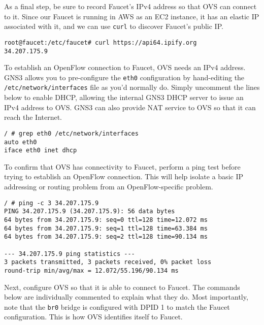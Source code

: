 As a final step, be sure to record Faucet's IPv4 address so that OVS can
connect to it. Since our Faucet is running in AWS as an EC2 instance,
it has an elastic IP associated with it, and we can use \verb|curl| to
discover Faucet's public IP\@.

\begin{verbatim}
root@faucet:/etc/faucet# curl https://api64.ipify.org
34.207.175.9
\end{verbatim}

To establish an OpenFlow connection to Faucet, OVS needs an IPv4 address.
GNS3 allows you to pre-configure the \verb|eth0| configuration by hand-editing
the \verb|/etc/network/interfaces| file as you'd normally do. Simply uncomment
the lines below to enable DHCP, allowing the internal GNS3 DHCP server to
issue an IPv4 address to OVS\@. GNS3 can also provide NAT service to OVS so
that it can reach the Internet.

\begin{verbatim}
/ # grep eth0 /etc/network/interfaces
auto eth0
iface eth0 inet dhcp
\end{verbatim}

To confirm that OVS has connectivity to Faucet, perform a ping test before
trying to establish an OpenFlow connection. This will help isolate a basic
IP addressing or routing problem from an OpenFlow-specific problem.

\begin{verbatim}
/ # ping -c 3 34.207.175.9
PING 34.207.175.9 (34.207.175.9): 56 data bytes
64 bytes from 34.207.175.9: seq=0 ttl=128 time=12.072 ms
64 bytes from 34.207.175.9: seq=1 ttl=128 time=63.384 ms
64 bytes from 34.207.175.9: seq=2 ttl=128 time=90.134 ms

--- 34.207.175.9 ping statistics ---
3 packets transmitted, 3 packets received, 0% packet loss
round-trip min/avg/max = 12.072/55.196/90.134 ms
\end{verbatim}

Next, configure OVS so that it is able to connect to Faucet. The
commands below are individually commented to explain what they do.
Most importantly, note that the \verb|br0| bridge is configured
with DPID 1 to match the Faucet configuration. This is how OVS
identifies itself to Faucet.

